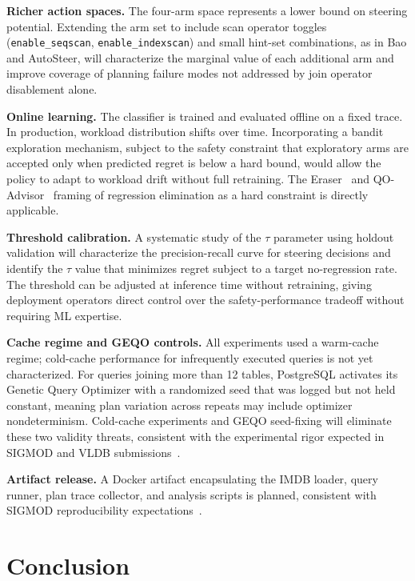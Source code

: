 \documentclass[sigconf,natbib=false]{article}
\newcommand{\postgres}{PostgreSQL}
\newcommand{\threshold}{\tau}
\begin{document}
\textbf{Richer action spaces.}
The four-arm space represents a lower bound on steering potential. Extending the arm set
to include scan operator toggles (\texttt{enable\_seqscan}, \texttt{enable\_indexscan}) and
small hint-set combinations, as in Bao and AutoSteer, will characterize the marginal value
of each additional arm and improve coverage of planning failure modes not addressed by join
operator disablement alone.

\textbf{Online learning.}
The classifier is trained and evaluated offline on a fixed trace. In production, workload
distribution shifts over time. Incorporating a bandit exploration mechanism, subject to the
safety constraint that exploratory arms are accepted only when predicted regret is below a
hard bound, would allow the policy to adapt to workload drift without full retraining. The
Eraser~\cite{Zhu2024Eraser} and QO-Advisor~\cite{Ding2022} framing of regression elimination
as a hard constraint is directly applicable.

\textbf{Threshold calibration.}
A systematic study of the $\threshold$ parameter using holdout validation will characterize
the precision-recall curve for steering decisions and identify the $\threshold$ value that
minimizes regret subject to a target no-regression rate. The threshold can be adjusted at
inference time without retraining, giving deployment operators direct control over the
safety-performance tradeoff without requiring ML expertise.

\textbf{Cache regime and GEQO controls.}
All experiments used a warm-cache regime; cold-cache performance for infrequently executed
queries is not yet characterized. For queries joining more than 12 tables, \postgres{}
activates its Genetic Query Optimizer with a randomized seed that was logged but not held
constant, meaning plan variation across repeats may include optimizer nondeterminism.
Cold-cache experiments and GEQO seed-fixing will eliminate these two validity threats,
consistent with the experimental rigor expected in SIGMOD and VLDB
submissions~\cite{Lehmann2024}.

\textbf{Artifact release.}
A Docker artifact encapsulating the IMDB loader, query runner, plan trace collector, and
analysis scripts is planned, consistent with SIGMOD reproducibility
expectations~\cite{SIGMODRepro}.

\section{Conclusion}
\label{sec:conclusion}
\end{document}
